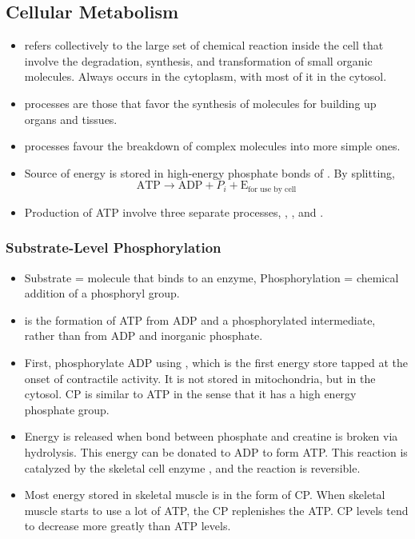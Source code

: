 \documentclass{article}
\numberwithin{equation}{section}
\begin{document}
\subsection{Cellular Metabolism}
\begin{itemize}
    \item {} refers collectively to the large set of chemical reaction inside the cell that involve the degradation, synthesis, and transformation of small organic molecules. Always occurs in the cytoplasm, with most of it in the cytosol.
    \item {} processes are those that favor the synthesis of molecules for building up organs and tissues.
    \item {} processes favour the breakdown of complex molecules into more simple ones.
    \item Source of energy is stored in high-energy phosphate bonds of . By splitting,
    \begin{equation}
        \text{ATP} \rightarrow \text{ADP} + P_i + \text{E}_\text{for use by cell}
    \end{equation}
    \item Production of ATP involve three separate processes, , , and .
\end{itemize}
\subsubsection{Substrate-Level Phosphorylation}
\begin{itemize}
    \item Substrate = molecule that binds to an enzyme, Phosphorylation = chemical addition of a phosphoryl group.
    \item {} is the formation of ATP from ADP and a phosphorylated intermediate, rather than from ADP and inorganic phosphate.
    \item First, phosphorylate ADP using , which is the first energy store tapped at the onset of contractile activity. It is not stored in mitochondria, but in the cytosol. CP is similar to ATP in the sense that it has a high energy phosphate group.
    \item Energy is released when bond between phosphate and creatine is broken via hydrolysis. This energy can be donated to ADP to form ATP. This reaction is catalyzed by the skeletal cell enzyme , and the reaction is reversible.
    \item Most energy stored in skeletal muscle is in the form of CP. When skeletal muscle starts to use a lot of ATP, the CP replenishes the ATP. CP levels tend to decrease more greatly than ATP levels.
\end{itemize}
\end{document}
